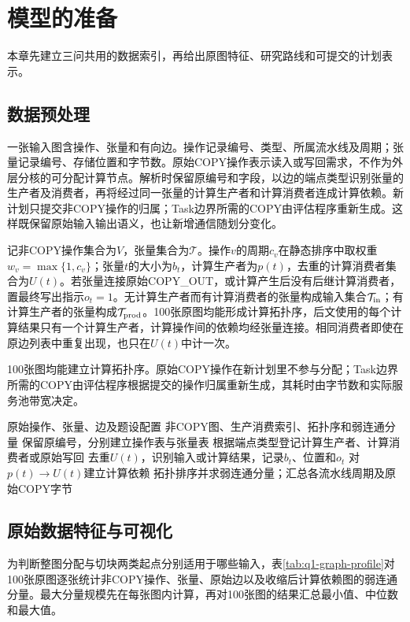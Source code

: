\section{模型的准备}
本章先建立三问共用的数据索引，再给出原图特征、研究路线和可提交的计划表示。

\subsection{数据预处理}
一张输入图含操作、张量和有向边。操作记录编号、类型、所属流水线及周期；张量记录编号、存储位置和字节数。原始COPY操作表示读入或写回需求，不作为外层分核的可分配计算节点。解析时保留原编号和字段，以边的端点类型识别张量的生产者及消费者，再将经过同一张量的计算生产者和计算消费者连成计算依赖。新计划只提交非COPY操作的归属；Task边界所需的COPY由评估程序重新生成。这样既保留原始输入输出语义，也让新增通信随划分变化。

记非COPY操作集合为$V$，张量集合为$\mathcal T$。操作$v$的周期$c_v$在静态排序中取权重$w_v=\max\{1,c_v\}$；张量$t$的大小为$b_t$，计算生产者为$p(t)$，去重的计算消费者集合为$U(t)$。若张量连接原始COPY\_OUT，或计算产生后没有后继计算消费者，置最终写出指示$o_t=1$。无计算生产者而有计算消费者的张量构成输入集合$\mathcal T_{\rm in}$；有计算生产者的张量构成$\mathcal T_{\rm prod}$。100张原图均能形成计算拓扑序，后文使用的每个计算结果只有一个计算生产者，计算操作间的依赖均经张量连接。相同消费者即使在原边列表中重复出现，也只在$U(t)$中计一次。

100张图均能建立计算拓扑序。原始COPY操作在新计划里不参与分配；Task边界所需的COPY由评估程序根据提交的操作归属重新生成，其耗时由字节数和实际服务池带宽决定。

\begin{algorithm}[H]\caption{计算依赖和张量接收域的预处理}
\begin{algorithmic}[1]
\REQUIRE 原始操作、张量、边及题设配置
\ENSURE 非COPY图、生产消费索引、拓扑序和弱连通分量
\STATE 保留原编号，分别建立操作表与张量表
\STATE 根据端点类型登记计算生产者、计算消费者或原始写回
\ENDFOR
{}
\STATE 去重$U(t)$，识别输入或计算结果，记录$b_t$、位置和$o_t$
\STATE 对$p(t)\to U(t)$建立计算依赖
\ENDFOR
\STATE 拓扑排序并求弱连通分量；汇总各流水线周期及原始COPY字节
\end{algorithmic}\end{algorithm}

\subsection{原始数据特征与可视化}
为判断整图分配与切块两类起点分别适用于哪些输入，表\ref{tab:q1-graph-profile}对100张原图逐张统计非COPY操作、张量、原始边以及收缩后计算依赖图的弱连通分量。最大分量规模先在每张图内计算，再对100张图的结果汇总最小值、中位数和最大值。

